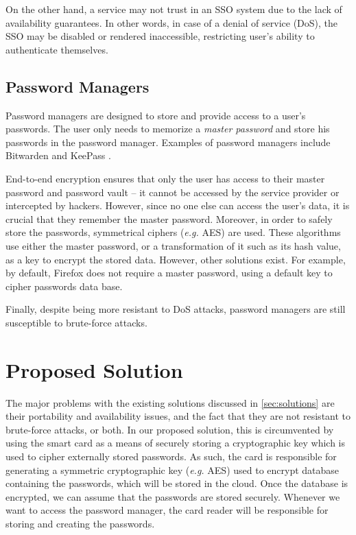 \documentclass[a4paper, 11pt]{article}
\begin{document}
On the other hand, a service may not trust in an SSO system due to the lack of availability 
guarantees. In other words, in case of a denial of service (DoS), the SSO may be disabled or 
rendered inaccessible, restricting user's ability to authenticate themselves.

\subsection{Password Managers}

Password managers are designed to store and provide access to a user's passwords. The user only 
needs to memorize a \textit{master password} and store his passwords in the password manager. 
Examples of password managers include Bitwarden \cite{Bitwarde48:online} and KeePass 
\cite{KeePassP1:online}.

End-to-end encryption ensures that only the user has access to their master password and password 
vault -- it cannot be accessed by the service provider or intercepted by hackers. However, since no 
one else can access the user's data, it is crucial that they remember the master password. 
Moreover, in order to safely store the passwords, symmetrical ciphers (\textit{e.g.} AES) are used. 
These algorithms use either the master password, or a transformation of it such as its hash value, 
as a key to encrypt the stored data. However, other solutions exist. For example, by default, 
Firefox does not require a master password, using a default key to cipher passwords data base.

Finally, despite being more resistant to DoS attacks, password managers are still susceptible to 
brute-force attacks.

\section{Proposed Solution}

The major problems with the existing solutions discussed in \cref{sec:solutions} are their 
portability and availability issues, and the fact that they are not resistant to brute-force 
attacks, or both. In our proposed solution, this is circumvented by using the smart card as a means 
of securely storing a cryptographic key which is used to cipher externally stored passwords. As 
such, the card is responsible for generating a symmetric cryptographic key (\textit{e.g.} AES) used 
to encrypt database containing the passwords, which will be stored in the cloud. Once the database 
is encrypted, we can assume that the passwords are stored securely. Whenever we want to access the 
password manager, the card reader will be responsible for storing and creating the passwords.
\end{document}
